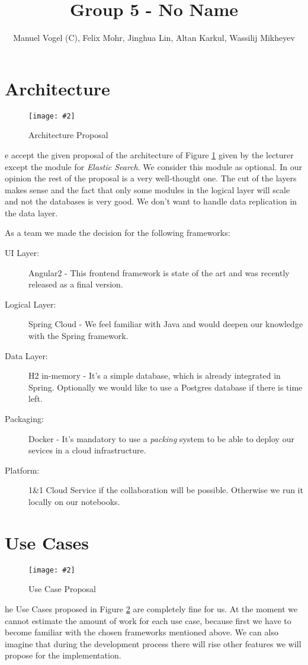\documentclass[]{article}
\title{Group 5 - \textbf{No Name}}
\author{Manuel Vogel (C), Felix Mohr,  Jinghua Lin,  Altan Karkul, Wassilij Mikheyev}
\newcommand{\cgraphic}[4]
{
	\begin{figure}[htb]
		\begin{center}
		\texttt{[image: \#2]}
		\end{center}
		\caption{#3}
		\label{fig:#2}
	\end{figure}
}%
\begin{document}
	
	\maketitle	

	\section{Architecture}
	\cgraphic{.17}{architecture_proposal}{Architecture Proposal}
	We accept the given proposal of the architecture of Figure \ref{fig:architecture_proposal} given by the lecturer except the module for \textit{Elastic Search}. We consider this module as optional. In our opinion the rest of the proposal is a very well-thought one. The cut of the layers makes sense and the fact that only some modules in the logical layer will scale and not the databases is very good. We don't want to handle data replication in the data layer. 
	
	As a team we made the decision for the following frameworks:
	\begin{description}
		\item[UI Layer:] Angular2 - This frontend framework is state of the art and was recently released as a final version. 
		\item[Logical Layer:] Spring Cloud - We feel familiar with Java and would deepen our knowledge with the Spring framework.
		\item[Data Layer:] H2 in-memory - It's a simple database, which is already integrated in Spring. Optionally we would like to use a Postgres database if there is time left.
		\item[Packaging:] Docker - It's mandatory to use a \textit{packing} system to be able to deploy our sevices in a cloud infrastructure.
		\item[Platform:] 1\&1 Cloud Service if the collaboration will be possible. Otherwise we run it locally on our notebooks.
	\end{description}

	\section{Use Cases}
	\cgraphic{.16}{use_cases_proposal}{Use Case Proposal}
	The Use Cases proposed in Figure \ref{fig:use_cases_proposal} are completely fine for us. At the moment we cannot estimate the amount of work for each use case, because first we have to become familiar with the chosen frameworks mentioned above. We can also imagine that during the development process there will rise other features we will propose for the implementation.
	
\end{document}
